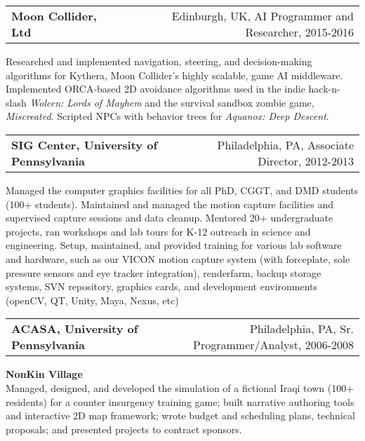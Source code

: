 \medskip
\medskip

\needspace{6em}
\begin{tabular*}{7.1in}{@{}l@{\extracolsep\fill}r}
{\large {\bf Moon Collider, Ltd}} & Edinburgh, UK, AI Programmer and Researcher, 2015-2016\\
\end{tabular*}

Researched and implemented navigation, steering, and decision-making algorithms for Kythera, Moon Collider's highly 
scalable, game AI middleware. Implemented ORCA-based 2D avoidance algorithms used in the indie hack-n-slash \emph{Wolcen: Lords of Mayhem} and the survival sandbox zombie game, \emph{Miscreated}. Scripted NPCs with behavior trees for \emph{Aquanox: Deep Descent}.

\medskip
\medskip

\needspace{6em}
\begin{tabular*}{7.1in}{@{}l@{\extracolsep\fill}r}
{\large {\bf SIG Center, University of Pennsylvania}} & Philadelphia, PA, Associate Director, 2012-2013\\
\end{tabular*}

Managed the computer graphics facilities for all PhD, CGGT, and DMD students (100+ students). Maintained and managed the motion capture facilities and supervised capture sessions and data cleanup. Mentored 20+ undergraduate projects, ran workshops and lab tours for K-12 outreach in science and engineering. Setup, maintained, and provided training for various lab software and hardware, such as our VICON motion capture system (with forceplate, sole pressure sensors and eye tracker integration), renderfarm, backup storage systems, SVN repository, graphics cards, and development environments (openCV, QT, Unity, Maya, Nexus, etc)

\medskip

\needspace{6em}
\begin{tabular*}{7.1in}{@{}l@{\extracolsep\fill}r}
{\large {\bf ACASA, University of Pennsylvania}} & Philadelphia, PA, Sr. Programmer/Analyst, 2006-2008\\
\end{tabular*}

{\bf NonKin Village}\\
Managed, designed, and developed the simulation of a fictional Iraqi town (100+ residents) for a counter insurgency training game; built narrative authoring tools and interactive 2D map framework; wrote budget and scheduling plans, technical proposals; and presented projects to contract sponsors.

